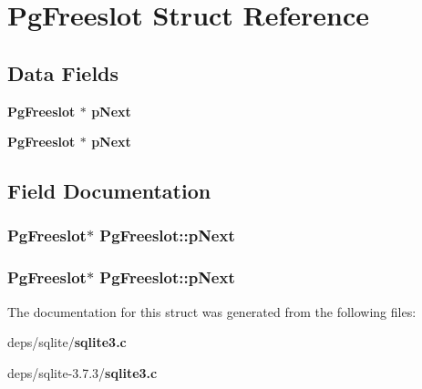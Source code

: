 \section{Pg\-Freeslot Struct Reference}
\label{structPgFreeslot}
\subsection*{Data Fields}
\begin{CompactItemize}
\item 
\bf{Pg\-Freeslot} $\ast$ \bf{p\-Next}
\item 
\bf{Pg\-Freeslot} $\ast$ \bf{p\-Next}
\end{CompactItemize}


\subsection{Field Documentation}
\subsubsection{\setlength{\rightskip}{0pt plus 5cm}\bf{Pg\-Freeslot}$\ast$ \bf{Pg\-Freeslot::p\-Next}}\label{structPgFreeslot_8c1d6975f7e3c4382f9ed086e6ed55fe}


\subsubsection{\setlength{\rightskip}{0pt plus 5cm}\bf{Pg\-Freeslot}$\ast$ \bf{Pg\-Freeslot::p\-Next}}\label{structPgFreeslot_8c1d6975f7e3c4382f9ed086e6ed55fe}




The documentation for this struct was generated from the following files:\begin{CompactItemize}
\item 
deps/sqlite/\bf{sqlite3.c}\item 
deps/sqlite-3.7.3/\bf{sqlite3.c}\end{CompactItemize}
